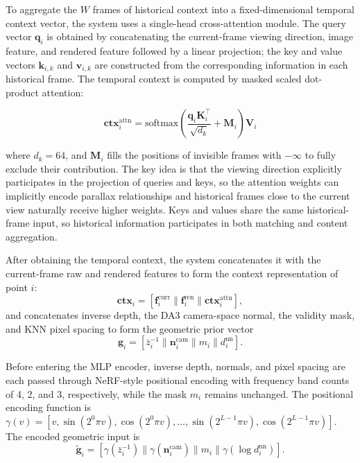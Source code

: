 \documentclass[lettersize,journal]{IEEEtran}
\begin{document}
 To aggregate the $W$ frames of historical context into a fixed-dimensional temporal context vector, the system uses a single-head cross-attention module. The query vector $\mathbf{q}_i$ is obtained by concatenating the current-frame viewing direction, image feature, and rendered feature followed by a linear projection; the key and value vectors $\mathbf{k}_{i,k}$ and $\mathbf{v}_{i,k}$ are constructed from the corresponding information in each historical frame. The temporal context is computed by masked scaled dot-product attention:

\begin{equation}
\mathbf{ctx}_i^{\text{attn}} = \text{softmax}\!\left(\frac{\mathbf{q}_i \mathbf{K}_i^\top}{\sqrt{d_k}} + \mathbf{M}_i\right) \mathbf{V}_i
\end{equation}

where $d_k = 64$, and $\mathbf{M}_i$ fills the positions of invisible frames with $-\infty$ to fully exclude their contribution. The key idea is that the viewing direction explicitly participates in the projection of queries and keys, so the attention weights can implicitly encode parallax relationships and historical frames close to the current view naturally receive higher weights. Keys and values share the same historical-frame input, so historical information participates in both matching and content aggregation.

 After obtaining the temporal context, the system concatenates it with the current-frame raw and rendered features to form the context representation of point $i$:
\begin{equation}
\mathbf{ctx}_i = [\mathbf{f}_i^{\text{curr}} \| \mathbf{f}_i^{\text{ren}} \| \mathbf{ctx}_i^{\text{attn}}],
\end{equation}
and concatenates inverse depth, the DA3 camera-space normal, the validity mask, and KNN pixel spacing to form the geometric prior vector
\begin{equation}
\mathbf{g}_i = [\bar{z}_i^{-1} \| \mathbf{n}_i^{\text{cam}} \| m_i \| d_i^{\text{nn}}].
\end{equation}

Before entering the MLP encoder, inverse depth, normals, and pixel spacing are each passed through NeRF-style positional encoding with frequency band counts of 4, 2, and 3, respectively, while the mask $m_i$ remains unchanged. The positional encoding function is $\gamma(v) = [v, \sin(2^0 \pi v), \cos(2^0 \pi v), \ldots, \sin(2^{L-1} \pi v), \cos(2^{L-1} \pi v)]$. The encoded geometric input is
\begin{equation}
\tilde{\mathbf{g}}_i =
[\gamma(\bar{z}_i^{-1}) \| \gamma(\mathbf{n}_i^{\text{cam}}) \| m_i \| \gamma(\log d_i^{\text{nn}})].
\end{equation}
\end{document}
